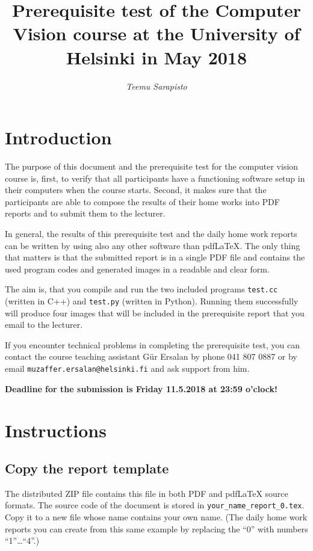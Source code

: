 \documentclass{article}
\begin{document}
\title{Prerequisite test of the Computer Vision course at the
  University of Helsinki in May 2018}

\author{\emph{Teemu Sarapisto}}
\maketitle

\newpage

\section{Introduction}

The purpose of this document and the prerequisite test for the
computer vision course is, first, to verify that all participants have
a functioning software setup in their computers when the course
starts.  Second, it makes sure that the participants are able to
compose the results of their home works into PDF reports and to submit
them to the lecturer.

In general, the results of this prerequisite test and the daily home
work reports can be written by using also any other software than
pdf\LaTeX{}.  The only thing that matters is that the submitted report
is in a single PDF file and contains the used program codes and
generated images in a readable and clear form.

The aim is, that you compile and run the two included programs
\texttt{test.cc} (written in C++) and \texttt{test.py} (written in
Python).  Running them successfully will produce four images that will
be included in the prerequisite report that you email to the lecturer.
 
If you encounter technical problems in completing the prerequisite
test, you can contact the course teaching assistant Gür Ersalan by
phone 041 807 0887 or by email \texttt{muzaffer.ersalan@helsinki.fi}
and ask support from him.

\textbf{Deadline for the submission is Friday 11.5.2018 at 23:59 o'clock!}

\section{Instructions}
\label{sec:running}

\subsection{Copy the report template}

The distributed ZIP file contains this file in both PDF and
pdf\LaTeX{} source formats.  The source code of the document is stored
in \texttt{your\_name\_report\_0.tex}.  Copy it to a new file whose
name contains your own name.  (The daily home work reports you can
create from this same example by replacing the ``0'' with numbers
``1''\ldots``4''.)
\end{document}
